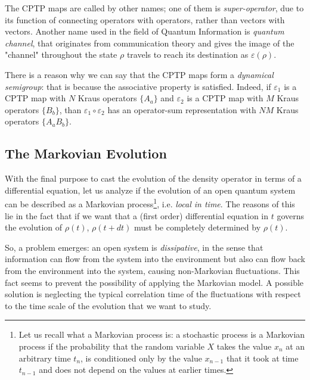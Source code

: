The CPTP maps are called by other names; one of them is \emph{super-operator}, due to its function of connecting operators with operators, rather than vectors with vectors. Another name used in the field of Quantum Information is \emph{quantum channel}, that originates from communication theory and gives the image of the "channel" throughout the state $\rho$ travels to reach its destination as $\varepsilon(\rho)$.

There is a reason why we can say that the CPTP maps form a \emph{dynamical semigroup}: that is because the associative property is satisfied. Indeed, if $\varepsilon_1$ is a CPTP map with $N$ Kraus operators $\{A_a\}$ and $\varepsilon_2$ is a CPTP map with $M$ Kraus operators $\{B_b\}$, than $\varepsilon_1 \circ \varepsilon_2$ has an operator-sum representation with $NM$ Kraus operators $\{A_aB_b\}$.

\subsection{The Markovian Evolution}
With the final purpose to cast the evolution of the density operator in terms of a differential equation, let us analyze if the evolution of an open quantum system can be described as a Markovian process\footnote{Let us recall what a Markovian process is: a stochastic process is a Markovian process if the probability that the random variable $X$ takes the value $x_n$ at an arbitrary time $t_n$, is conditioned only by the value $x_{n-1}$ that it took at time $t_{n-1}$ and does not depend on the values at earlier times.}, i.e. \emph{local in time}. The reasons of this lie in the fact that if we want that a (first order) differential equation in $t$ governs the evolution of $\rho(t)$, $\rho(t+dt)$ must be completely determined by $\rho(t)$.

So, a problem emerges: an open system is \emph{dissipative}, in the sense that information can flow from the system into the environment but also can flow back from the environment into the system, causing non-Markovian fluctuations. This fact seems to prevent the possibility of applying the Markovian model.  A possible solution is neglecting the typical correlation time of the fluctuations with respect to the time scale of the evolution that we want to study.


